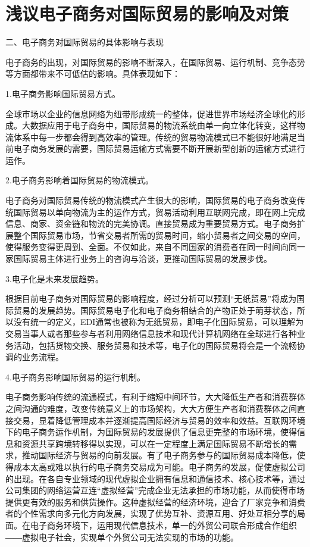 \chapter{浅议电子商务对国际贸易的影响及对策}
二、电子商务对国际贸易的具体影响与表现

电子商务的出现，对国际贸易的影响不断深入，在国际贸易、运行机制、竞争态势等方面都带来不可低估的影响。具体表现如下：

1.电子商务影响国际贸易方式。

全球市场以企业的信息网络为纽带形成统一的整体，促进世界市场经济全球化的形成。大数据应用于电子商务中，国际贸易的物流系统由单一向立体化转变，这样物流体系中每一步都会得到高效率的管理。传统的贸易物流模式已不能很好地满足当前电子商务发展的需要，国际贸易运输方式需要不断开展新型创新的运输方式进行运作。

2.电子商务影响着国际贸易的物流模式。

电子商务对国际贸易传统的物流模式产生很大的影响，国际贸易的电子商务改变传统国际贸易以单向物流为主的运作方式，贸易活动利用互联网完成，即在网上完成信息、商家、资金链和物流的完美协调。直接贸易成为重要贸易方式。电子商务扩展整个国际贸易市场，节省交易者所需的贸易时间，缩小贸易者之间交易的空间，使得服务变得更周到、全面。不仅如此，来自不同国家的消费者在同一时间向同一家国际贸易主体进行业务上的咨询与洽谈，更推动国际贸易的发展步伐。

3.电子化是未来发展趋势。

根据目前电子商务对国际贸易的影响程度，经过分析可以预测“无纸贸易”将成为国际贸易的发展趋势。国际贸易电子化和电子商务相结合的产物正处于萌芽状态，所以没有统一的定义，EDI通常也被称为无纸贸易，即电子化国际贸易，可以理解为交易当事人或者那些参与者利用网络信息技术和现代计算机网络在全球进行各种业务活动，包括货物交换、服务贸易和技术等，电子化的国际贸易将会是一个流畅协调的业务流程。

4.电子商务影响国际贸易的运行机制。

电子商务影响传统的流通模式，有利于缩短中间环节，大大降低生产者和消费群体之间沟通的难度，改变传统意义上的市场架构，大大方便生产者和消费群体之间直接交易，显着降低管理成本并逐渐提高国际经济与贸易的效率和效益。互联网环境下的电子商务运作机制，为国际贸易的发展提供了信息更完整的市场环境，使得信息和资源共享跨境转移得以实现，可以在一定程度上满足国际贸易不断增长的需求，推动国际经济与贸易的向前发展。有了电子商务参与的国际贸易成本降低，使得成本太高或难以执行的电子商务交易成为可能。电子商务的发展，促使虚拟公司的出现。在各自专业领域的现代虚拟企业拥有信息和通信技术、核心技术等，通过公司集团的网络运营互连“虚拟经营”完成企业无法承担的市场功能，从而使得市场提供更有效的服务和供货操作。这种虚拟经营的经济环境，迎合了厂家竞争和消费者的个性需求向多元化方向发展，实现了优势互补、资源互用、好处互相分享的局面。在电子商务环境下，运用现代信息技术，单一的外贸公司联合形成合作组织――虚拟电子社会，实现单个外贸公司无法实现的市场的功能。

